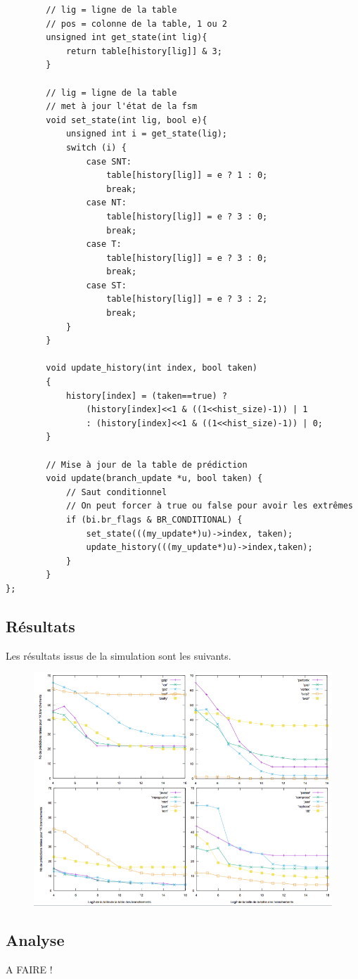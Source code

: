 \documentclass[a4paper]{article}
\begin{document}
\begin{verbatim}
        // lig = ligne de la table
        // pos = colonne de la table, 1 ou 2
        unsigned int get_state(int lig){
            return table[history[lig]] & 3;
        }

        // lig = ligne de la table
        // met à jour l'état de la fsm
        void set_state(int lig, bool e){
            unsigned int i = get_state(lig);
            switch (i) {
                case SNT:
                    table[history[lig]] = e ? 1 : 0;
                    break;
                case NT:
                    table[history[lig]] = e ? 3 : 0;
                    break;
                case T:
                    table[history[lig]] = e ? 3 : 0;
                    break;
                case ST:
                    table[history[lig]] = e ? 3 : 2;
                    break;
            }
        }

        void update_history(int index, bool taken)
        {
            history[index] = (taken==true) ?
                (history[index]<<1 & ((1<<hist_size)-1)) | 1
                : (history[index]<<1 & ((1<<hist_size)-1)) | 0;
        }

        // Mise à jour de la table de prédiction
        void update(branch_update *u, bool taken) {
            // Saut conditionnel
            // On peut forcer à true ou false pour avoir les extrêmes
            if (bi.br_flags & BR_CONDITIONAL) {
                set_state(((my_update*)u)->index, taken);
                update_history(((my_update*)u)->index,taken);
            }
        }
};
\end{verbatim}
\normalsize

\subsection{Résultats}

Les résultats issus de la simulation sont les suivants.
\begin{figure}[t]
\includegraphics[width=\linewidth]{2-bit-local.png}
\centering
\end{figure}

\subsection{Analyse}

A FAIRE !
\end{document}
